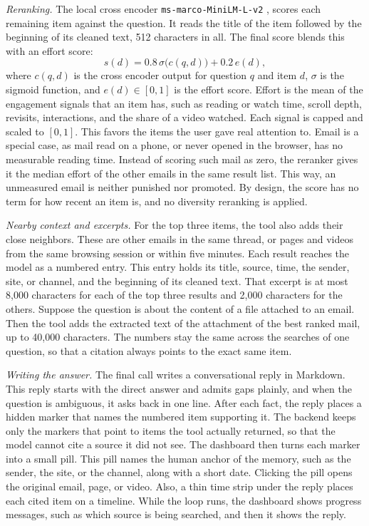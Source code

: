 \documentclass[conference]{IEEEtran}
\newcommand{\rerankmodel}{\texttt{ms\allowbreak-marco\allowbreak-MiniLM\allowbreak-L\allowbreak-6\allowbreak-v2}}
\begin{document}
\textit{Reranking.} The local cross encoder \rerankmodel{} \cite{b10}, \cite{b11} scores each remaining item against the question. It reads the title of the item followed by the beginning of its cleaned text, 512 characters in all. The final score blends this with an effort score:
\begin{equation}
s(d) = 0.8\,\sigma\big(c(q,d)\big) + 0.2\,e(d), \label{eq:final}
\end{equation}
where $c(q,d)$ is the cross encoder output for question $q$ and item $d$, $\sigma$ is the sigmoid function, and $e(d) \in [0,1]$ is the effort score. Effort is the mean of the engagement signals that an item has, such as reading or watch time, scroll depth, revisits, interactions, and the share of a video watched. Each signal is capped and scaled to $[0,1]$. This favors the items the user gave real attention to. Email is a special case, as mail read on a phone, or never opened in the browser, has no measurable reading time. Instead of scoring such mail as zero, the reranker gives it the median effort of the other emails in the same result list. This way, an unmeasured email is neither punished nor promoted. By design, the score has no term for how recent an item is, and no diversity reranking is applied.

\textit{Nearby context and excerpts.} For the top three items, the tool also adds their close neighbors. These are other emails in the same thread, or pages and videos from the same browsing session or within five minutes. Each result reaches the model as a numbered entry. This entry holds its title, source, time, the sender, site, or channel, and the beginning of its cleaned text. That excerpt is at most 8,000 characters for each of the top three results and 2,000 characters for the others. Suppose the question is about the content of a file attached to an email. Then the tool adds the extracted text of the attachment of the best ranked mail, up to 40,000 characters. The numbers stay the same across the searches of one question, so that a citation always points to the exact same item.

\textit{Writing the answer.} The final call writes a conversational reply in Markdown. This reply starts with the direct answer and admits gaps plainly, and when the question is ambiguous, it asks back in one line. After each fact, the reply places a hidden marker that names the numbered item supporting it. The backend keeps only the markers that point to items the tool actually returned, so that the model cannot cite a source it did not see. The dashboard then turns each marker into a small pill. This pill names the human anchor of the memory, such as the sender, the site, or the channel, along with a short date. Clicking the pill opens the original email, page, or video. Also, a thin time strip under the reply places each cited item on a timeline. While the loop runs, the dashboard shows progress messages, such as which source is being searched, and then it shows the reply.
\end{document}
